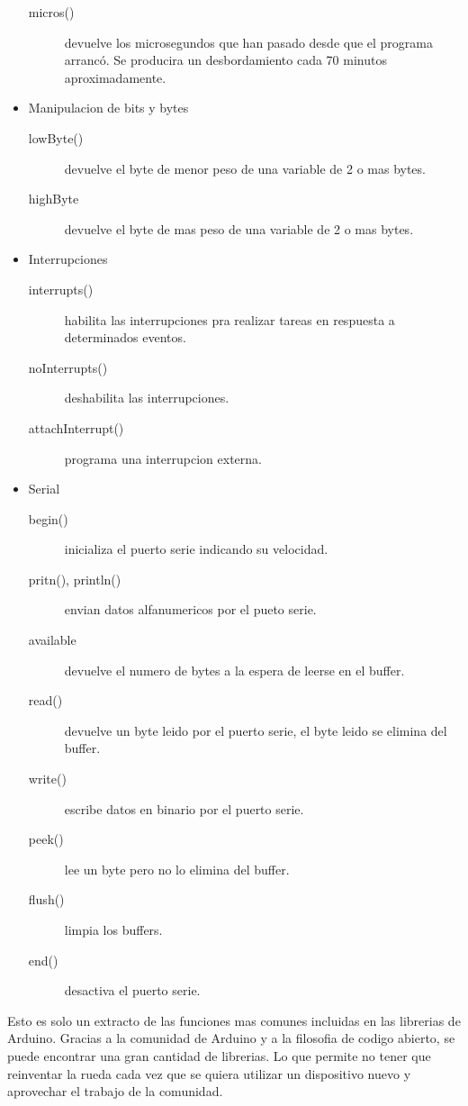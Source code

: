 \begin{itemize}
\begin{description}
            \item[micros()] devuelve los microsegundos que han pasado desde que el programa arrancó. Se producira un desbordamiento cada 70 minutos aproximadamente.
        \end{description}
    \item Manipulacion de bits y bytes
        \begin{description}
            \item[lowByte()] devuelve el byte de menor peso de una variable de 2 o mas bytes.
            \item[highByte] devuelve el byte de mas peso de una variable de 2 o mas bytes.
        \end{description}
    \item Interrupciones
        \begin{description}
            \item[interrupts()] habilita las interrupciones pra realizar tareas en respuesta a determinados eventos.
            \item[noInterrupts()] deshabilita las interrupciones.
            \item[attachInterrupt()] programa una interrupcion externa.
        \end{description}
    \item Serial
        \begin{description}
            \item[begin()] inicializa el puerto serie indicando su velocidad.
            \item[pritn(), println()] envian datos alfanumericos por el pueto serie.
            \item[available] devuelve el numero de bytes a la espera de leerse en el buffer.
            \item[read()] devuelve un byte leido por el puerto serie, el byte leido se elimina del buffer.
            \item[write()] escribe datos en binario por el puerto serie.
            \item[peek()] lee un byte pero no lo elimina del buffer.
            \item[flush()] limpia los buffers.
            \item[end()] desactiva el puerto serie.
        \end{description}
\end{itemize}

Esto es solo un extracto de las funciones mas comunes incluidas en las librerias de Arduino. Gracias a la comunidad de Arduino y a la filosofia de codigo abierto, se puede encontrar una gran cantidad de librerias. Lo que permite no tener que reinventar la rueda cada vez que se quiera utilizar un dispositivo nuevo y aprovechar el trabajo de la comunidad.

